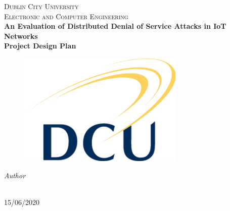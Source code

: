\begin{titlepage}
  \begin{center}

    \textsc{\LARGE Dublin City University}\\[1cm]
    \textsc{\Large Electronic and Computer Engineering}\\[0.5cm]

    {\LARGE \bfseries An Evaluation of Distributed Denial of Service Attacks in
    IoT Networks\\[0.4cm]}
    {\Large \bfseries Project Design Plan\\[0.4cm]}

    \begin{figure}[H]
	\includegraphics{images/Dcu-logo.png}
	\centering
    \end{figure}

    \vskip 2cm
    \emph{Author}\\[0.1cm]
    \noindent{}\\[0.1cm]

    \vfill

    {\large{15/06/2020}}

  \end{center}
\end{titlepage}

